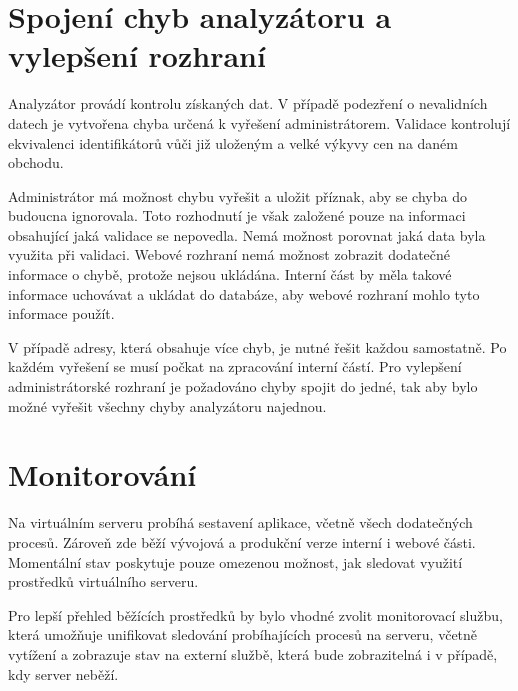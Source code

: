 \documentclass[thesis=B,czech]{FITthesis}[2012/06/26]
\begin{document}
\section{Spojení chyb analyzátoru a vylepšení rozhraní} \label{analyser-join}
Analyzátor provádí kontrolu získaných dat. V případě podezření o nevalidních datech je vytvořena chyba určená k vyřešení
administrátorem. Validace kontrolují ekvivalenci identifikátorů vůči již uloženým a velké výkyvy cen na daném obchodu.
\par
Administrátor má možnost chybu vyřešit a uložit příznak, aby se chyba do budoucna ignorovala. Toto rozhodnutí je však
založené pouze na informaci obsahující jaká validace se nepovedla. Nemá možnost porovnat jaká data byla využita při validaci.
Webové rozhraní nemá možnost zobrazit dodatečné informace o chybě, protože nejsou ukládána. Interní část by měla takové informace
uchovávat a ukládat do databáze, aby webové rozhraní mohlo tyto informace použít.
\par
V případě adresy, která obsahuje více chyb, je nutné řešit každou samostatně. Po každém vyřešení se musí počkat na zpracování interní částí.
Pro vylepšení administrátorské rozhraní je požadováno chyby spojit do jedné, tak aby bylo možné vyřešit všechny chyby analyzátoru najednou.

\section{Monitorování}
Na virtuálním serveru probíhá sestavení aplikace, včetně všech dodatečných procesů. Zároveň zde běží vývojová a produkční verze interní i webové části.
Momentální stav poskytuje pouze omezenou možnost, jak sledovat využití prostředků virtuálního serveru.
\par
Pro lepší přehled běžících prostředků by bylo vhodné zvolit monitorovací službu, která umožňuje unifikovat sledování
probíhajících procesů na serveru, včetně vytížení a zobrazuje stav na externí službě, která bude zobrazitelná i v případě, kdy server neběží.
\end{document}
